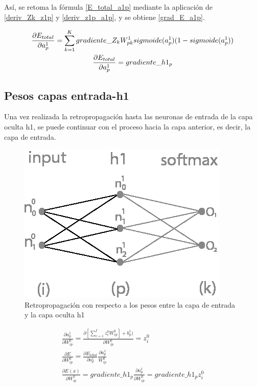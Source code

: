 Así, se retoma la fórmula \ref{E_total_a1p} mediante la aplicación de \ref{deriv_Zk_z1p} y \ref{deriv_z1p_a1p}, y se obtiene \ref{grad_E_a1p}.

\begin{gather}
	\frac{\partial E_{total}}{\partial a^1_p} = \sum_{k=1}^K  gradiente\_Z_k   W^1_{pk}   sigmoide(a^1_p) (1-sigmoide(a^1_p)) \label{grad_E_a1p} \\
	\frac{\partial E_{total}}{\partial a^1_p} = gradiente\_h1_p \notag
\end{gather}

\subsection{Pesos capas entrada-h1}

Una vez realizada la retropropagación hasta las neuronas de entrada de la capa oculta h1, se puede continuar con el proceso hacia la capa anterior, es decir, la capa de entrada.

\begin{figure}[H]
	\centering
	\includegraphics[scale=0.35]{imagenes/nn_1_capa_pesos_input_h1.jpg}  
	\caption{Retropropagación con respecto a los pesos entre la capa de entrada y la capa oculta h1}
	\label{fig:nn_1_pesos_input_h1}
\end{figure}


\begin{gather}
	\frac{\partial a^1_p }{\partial W^0_{ip} } = \frac{\partial [\sum_{c=1}^{I} z^0_c   W^0_{cp}] + b^1_p)}{\partial W^0_{ip} } = z^0_i \label{grad_w0ip_1} \\
	\frac{\partial E}{\partial W^0_{ip}} = \frac{\partial E_{total} }{\partial a^1_p }   \frac{\partial a^1_p}{W^0_{ip}} \label{grad_w0ip_2} \\
	\frac{\partial E(x) }{\partial W^0_{ip} } = gradiente\_h1_p   \frac{\partial a^1_p }{\partial W^0_{ip} } = gradiente\_h1_p   z^0_i 
	\label{grad_w0ip_3}
\end{gather}


